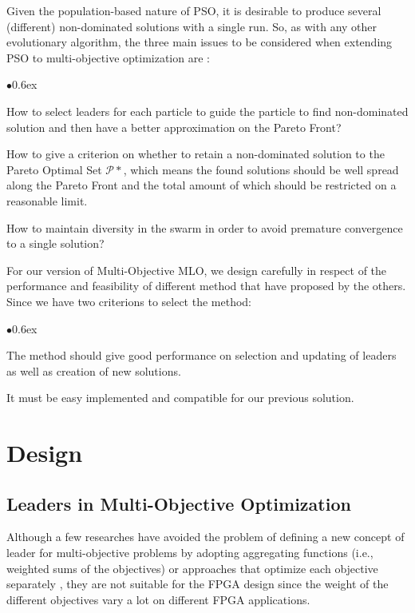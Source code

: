\documentclass[11pt, runningheads,a4paper]{llncs}
\begin{document}
Given the population-based nature of PSO, it is desirable to produce several (different) non-dominated solutions with a single run. So, as with any other evolutionary algorithm, the three main issues to be considered when extending PSO to multi-objective optimization are \cite{moissue}:
\begin{list}{$\bullet$}{\itemsep 0.6ex}

\item How to select leaders for each particle to guide the particle to find non-dominated solution and then have a better approximation on the Pareto Front?
\item How to give a criterion on whether to retain a non-dominated solution to the Pareto Optimal Set $\mathcal{P}*$, which means the found solutions should be well spread along the Pareto Front and the total amount of which should be restricted on a reasonable limit. 
\item How to maintain diversity in the swarm in order to avoid premature convergence to a single solution?
\end{list}
For our version of Multi-Objective MLO, we design carefully in respect of the performance and feasibility of different method that have proposed by the others. Since we have two criterions to select the method: 


\begin{list}{$\bullet$}{\itemsep 0.6ex}
\item The method should give good performance on selection and updating of leaders as well as creation of new solutions.
\item It must be easy implemented and compatible for our previous solution.
\end{list}

\section{Design} 
\label{design}
\subsection{Leaders in Multi-Objective Optimization}
Although a few researches have avoided the problem of defining a new concept of leader for multi-objective problems by adopting aggregating functions (i.e., weighted sums of the objectives) or approaches that optimize each objective separately \cite{mosurvey}, they are not suitable for the FPGA design since the weight of the different objectives vary a lot on different FPGA applications.
\end{document}
